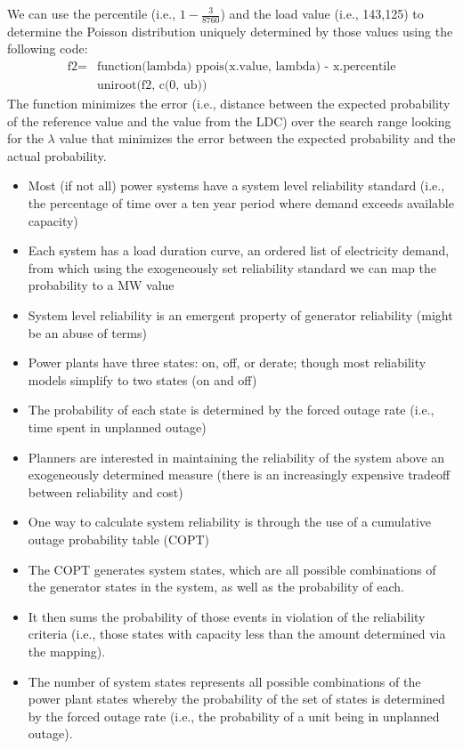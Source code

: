 \documentclass[10pt]{amsart}
\begin{document}
We can use the percentile (i.e., $1-\frac{3}{8760}$) and the load value (i.e., 143,125) to determine the Poisson distribution uniquely determined by those values using the following code:
\begin{align*}
\text{f2} = &\text{function(lambda) ppois(x.value, lambda) - x.percentile} \\
&\text{uniroot(f2, c(0, ub))}
\end{align*}
The function minimizes the error (i.e., distance between the expected probability of the reference value and the value from the LDC) over the search range looking for the $\lambda$ value that minimizes the error between the expected probability and the actual probability. 

\begin{itemize}
\item Most (if not all) power systems have a system level reliability standard (i.e., the percentage of time over a ten year period where demand exceeds available capacity)
\item Each system has a load duration curve, an ordered list of electricity demand, from which using the exogeneously set reliability standard we can map the probability to a MW value
\item System level reliability is an emergent property of generator reliability (might be an abuse of terms)
\item Power plants have three states: on, off, or derate; though most reliability models simplify to two states (on and off)
\item The probability of each state is determined by the forced outage rate (i.e., time spent in unplanned outage)
\item Planners are interested in maintaining the reliability of the system above an exogeneously determined measure (there is an increasingly expensive tradeoff between reliability and cost)
\item One way to calculate system reliability is through the use of a cumulative outage probability table (COPT) 
\item The COPT generates system states, which are all possible combinations of the generator states in the system, as well as the probability of each.
\item It then sums the probability of those events in violation of the reliability criteria (i.e., those states with capacity less than the amount determined via the mapping).
\item The number of system states represents all possible combinations of the power plant states whereby the probability of the set of states is determined by the forced outage rate (i.e., the probability of a unit being in unplanned outage). 

\end{itemize}
\end{document}
